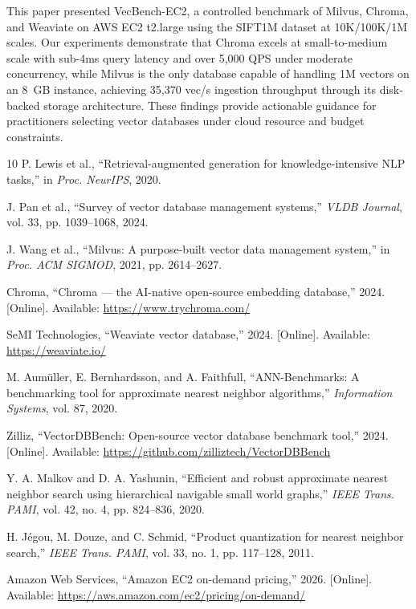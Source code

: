\documentclass[12pt,a4paper]{article}
\begin{document}
This paper presented VecBench-EC2, a controlled benchmark of Milvus, Chroma, and Weaviate on AWS EC2 t2.large using the SIFT1M dataset at 10K/100K/1M scales. Our experiments demonstrate that Chroma excels at small-to-medium scale with sub-4ms query latency and over 5,000 QPS under moderate concurrency, while Milvus is the only database capable of handling 1M vectors on an 8~GB instance, achieving 35,370 vec/s ingestion throughput through its disk-backed storage architecture. These findings provide actionable guidance for practitioners selecting vector databases under cloud resource and budget constraints.

\begin{thebibliography}{10}
P. Lewis et al., ``Retrieval-augmented generation for knowledge-intensive NLP tasks,'' in \textit{Proc. NeurIPS}, 2020.

J. Pan et al., ``Survey of vector database management systems,'' \textit{VLDB Journal}, vol. 33, pp. 1039--1068, 2024.

J. Wang et al., ``Milvus: A purpose-built vector data management system,'' in \textit{Proc. ACM SIGMOD}, 2021, pp. 2614--2627.

Chroma, ``Chroma --- the AI-native open-source embedding database,'' 2024. [Online]. Available: \url{https://www.trychroma.com/}

SeMI Technologies, ``Weaviate vector database,'' 2024. [Online]. Available: \url{https://weaviate.io/}

M. Aum\"{u}ller, E. Bernhardsson, and A. Faithfull, ``ANN-Benchmarks: A benchmarking tool for approximate nearest neighbor algorithms,'' \textit{Information Systems}, vol. 87, 2020.

Zilliz, ``VectorDBBench: Open-source vector database benchmark tool,'' 2024. [Online]. Available: \url{https://github.com/zilliztech/VectorDBBench}

Y. A. Malkov and D. A. Yashunin, ``Efficient and robust approximate nearest neighbor search using hierarchical navigable small world graphs,'' \textit{IEEE Trans. PAMI}, vol. 42, no. 4, pp. 824--836, 2020.

H. J\'{e}gou, M. Douze, and C. Schmid, ``Product quantization for nearest neighbor search,'' \textit{IEEE Trans. PAMI}, vol. 33, no. 1, pp. 117--128, 2011.

Amazon Web Services, ``Amazon EC2 on-demand pricing,'' 2026. [Online]. Available: \url{https://aws.amazon.com/ec2/pricing/on-demand/}
\end{thebibliography}
\end{document}
